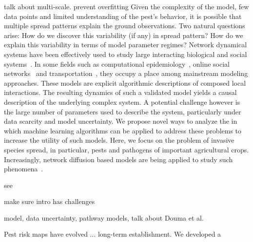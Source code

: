 \documentclass[11pt]{article}
\theoremstyle{definition}
\begin{document}
talk about multi-scale. prevent overfitting
Given the complexity of the model, few data points and limited
understanding of the pest's behavior, it is possible that multiple spread
patterns explain the ground observations. Two natural questions arise: How
do we discover this variability (if any) in spread pattern? How do we
explain this variability in terms of model parameter regimes? 
Network dynamical systems have been effectively used to study large
interacting biological and social systems~\cite{}. In
some fields such as computational epidemiology~\cite{eubank2004modelling},
online social networks~\cite{guille2013information} and
transportation~\cite{transims}, they occupy a place among mainstream
modeling approaches.  These models are explicit algorithmic descriptions of
composed local interactions. The resulting dynamics of such a validated
model yields a causal description of the underlying complex system. A
potential challenge however is the large number of parameters used to
describe the system, particularly under data scarcity and model
uncertainty.  We propose novel ways to analyze the in which machine
learning algorithms can be applied to address these problems to increase
the utility of such models.  Here, we focus on the problem of invasive
species spread, in particular, pests and pathogens of important
agricultural crops.  Increasingly, network diffusion based models are being
applied to study such
phenomena~\cite{carrasco2010unveiling,nopsa2015ecological}.

see \cite{jordan2019modeling}


make sure intro has challenges

model, data uncertainty, pathway models, talk about Douma et al.


Pest risk maps have evolved ... long-term establishment. 
 We developed a 

\end{document}
